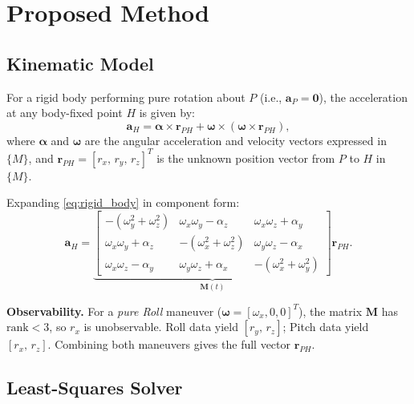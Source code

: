 \documentclass[conference]{IEEEtran}
\newcommand{\vv}[1]{\bm{#1}}          %
\newcommand{\rPH}{\vv{r}_{PH}}
\newcommand{\omg}{\bm{\omega}}
\newcommand{\alp}{\bm{\alpha}}
\newcommand{\aH}{\vv{a}_{H}}
\begin{document}
\section{Proposed Method}
\label{sec:method}

\subsection{Kinematic Model}

For a rigid body performing pure rotation about $P$ (i.e.,
$\vv{a}_P = \vv{0}$), the acceleration at any body-fixed point $H$
is given by:
\begin{equation}
  \aH = \alp \times \rPH + \omg \times (\omg \times \rPH),
  \label{eq:rigid_body}
\end{equation}
where $\alp$ and $\omg$ are the angular acceleration and velocity
vectors expressed in $\{M\}$, and $\rPH = [r_x,\,r_y,\,r_z]^T$ is
the unknown position vector from $P$ to $H$ in $\{M\}$.

Expanding \eqref{eq:rigid_body} in component form:
\begin{equation}
  \aH = \underbrace{\begin{bmatrix}
    -(\omega_y^2+\omega_z^2) & \omega_x\omega_y - \alpha_z & \omega_x\omega_z + \alpha_y \\
    \omega_x\omega_y + \alpha_z & -(\omega_x^2+\omega_z^2) & \omega_y\omega_z - \alpha_x \\
    \omega_x\omega_z - \alpha_y & \omega_y\omega_z + \alpha_x & -(\omega_x^2+\omega_y^2)
  \end{bmatrix}}_{\mathbf{M}(t)}
  \rPH.
  \label{eq:matrix_form}
\end{equation}

\textbf{Observability.}
For a \emph{pure Roll} maneuver ($\omg = [\omega_x,0,0]^T$), the
matrix $\mathbf{M}$ has $\mathrm{rank} < 3$, so $r_x$ is unobservable.
Roll data yield $[r_y,\,r_z]$; Pitch data yield $[r_x,\,r_z]$.
Combining both maneuvers gives the full vector $\rPH$.

\subsection{Least-Squares Solver}
\end{document}

